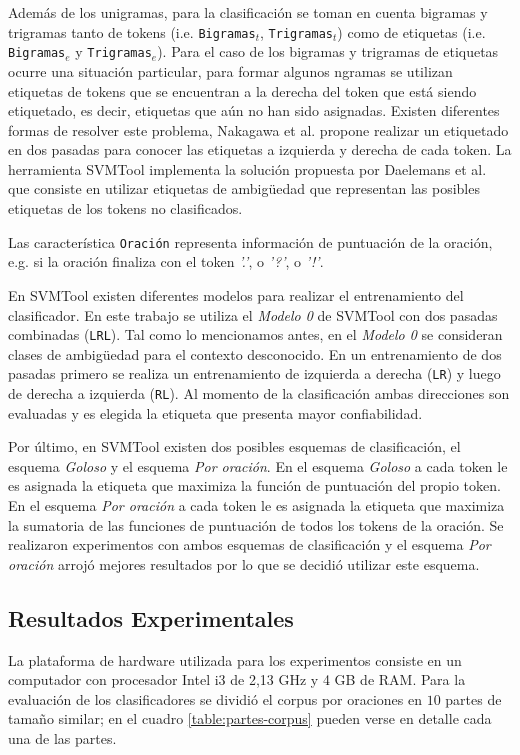 \documentclass[runningheads,a4paper]{llncs}
\begin{document}
Adem\'as de los unigramas, para la clasificaci\'on se toman en cuenta bigramas y trigramas tanto de tokens (i.e. \texttt{\small Bigramas$_{t}$}, \texttt{\small Trigramas$_{t}$}) como de etiquetas (i.e. \texttt{\small Bigramas$_{e}$} y \texttt{\small Trigramas$_{e}$}). Para el caso de los bigramas y trigramas de etiquetas ocurre una situaci\'on particular, para formar algunos ngramas se utilizan etiquetas de tokens que se encuentran a la derecha del token que está siendo etiquetado, es decir, etiquetas que aún no han sido asignadas. Existen diferentes formas de resolver este problema, Nakagawa et al.\cite{NAKAGAWA01} propone realizar un etiquetado en dos pasadas para conocer las etiquetas a izquierda y derecha de cada token. La herramienta SVMTool implementa la solución propuesta por Daelemans et al.\cite{DAELEMANS96} que consiste en utilizar etiquetas de ambig\"uedad que representan las posibles etiquetas de los tokens no clasificados.

Las caracter\'istica \texttt{\small Oraci\'on} representa información de puntuación de la oración, e.g. si la oración finaliza con el token \emph{'.'}, o \emph{'?'}, o \emph{'!'}.

En SVMTool existen diferentes modelos para realizar el entrenamiento del clasificador. En este trabajo se utiliza el \emph{Modelo 0} de SVMTool con dos pasadas combinadas (\texttt{\small LRL}). Tal como lo mencionamos antes, en el \emph{Modelo 0} se consideran clases de ambig\"uedad para el contexto desconocido. En un entrenamiento de dos pasadas primero se realiza un entrenamiento de izquierda a derecha (\texttt{\small LR}) y luego de derecha a izquierda (\texttt{\small RL}). Al momento de la clasificación ambas direcciones son evaluadas y es elegida la etiqueta que presenta mayor confiabilidad.

Por último, en SVMTool existen dos posibles esquemas de clasificación, el esquema \emph{Goloso} y el esquema \emph{Por oración}. En el esquema \emph{Goloso} a cada token le es asignada la etiqueta que maximiza la función de puntuación del propio token. En el esquema \emph{Por oración} a cada token le es asignada la etiqueta que maximiza la sumatoria de las funciones de puntuación de todos los tokens de la oración. Se realizaron experimentos con ambos esquemas de clasificación y el esquema \emph{Por oración} arrojó mejores resultados por lo que se decidió utilizar este esquema.

\subsection{Resultados Experimentales}
La plataforma de hardware utilizada para los experimentos consiste en un computador con procesador Intel i3 de 2,13 GHz y 4 GB de RAM. Para la evaluación de los clasificadores se dividió el corpus por oraciones en $10$ partes de tamaño similar; en el cuadro \ref{table:partes-corpus} pueden verse en detalle cada una de las partes. 
\end{document}
